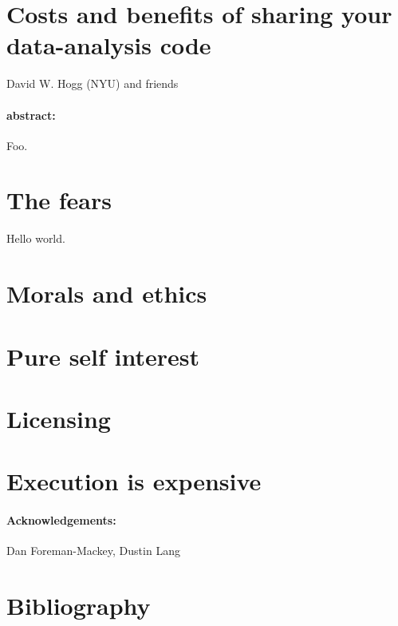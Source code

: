 \documentclass[12pt]{article}
\begin{document}
\section*{Costs and benefits of sharing your data-analysis code}

\noindent
David W. Hogg (NYU) and friends

\paragraph{abstract:}
Foo.

\section{The fears}

Hello world.

\section{Morals and ethics}

\section{Pure self interest}

\section{Licensing}

\section{Execution is expensive}

\paragraph{Acknowledgements:}
Dan Foreman-Mackey,
Dustin Lang

\section*{Bibliography}
\end{document}
